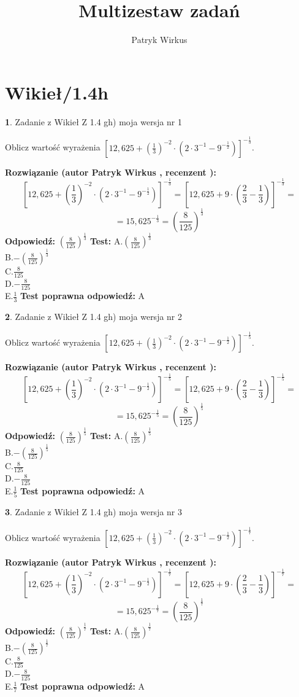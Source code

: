 \documentclass[12pt, a4paper]{article}
\title{Multizestaw zadań}
\author{Patryk Wirkus}
\date{}
\theoremstyle{definition} %
\newtheorem{zad}{}
\newcommand{\kategoria}[1]{\section{#1}}
\newcommand{\zadStart}[1]{\begin{zad}#1\newline}
\newcommand{\zadStop}{\end{zad}}
\newcommand{\rozwStart}[2]{\noindent \textbf{Rozwiązanie (autor #1 , recenzent #2): }\newline}
\newcommand{\rozwStop}{\newline}
\newcommand{\odpStart}{\noindent \textbf{Odpowiedź:}\newline}
\newcommand{\odpStop}{\newline}
\newcommand{\testStart}{\noindent \textbf{Test:}\newline}
\newcommand{\testStop}{\newline}
\newcommand{\kluczStart}{\noindent \textbf{Test poprawna odpowiedź:}\newline}
\newcommand{\kluczStop}{\newline}
\begin{document}
\maketitle

\kategoria{Wikieł/1.4h}


\zadStart{Zadanie z Wikieł Z 1.4 gh) moja wersja nr 1}

Oblicz wartość wyrażenia $[12,625+(\frac{1}{3})^{-2}\cdot(2\cdot 3^{-1} - 9^{-\frac{1}{2}})]^{-\frac{1}{3}}$.
\zadStop
\rozwStart{Patryk Wirkus}{}
$$[12,625+(\frac{1}{3})^{-2}\cdot(2\cdot 3^{-1} - 9^{-\frac{1}{2}})]^{-\frac{1}{3}} = [12,625+9\cdot (\frac{2}{3}-\frac{1}{3})]^{-\frac{1}{3}} =$$
$$=15,625^{-\frac{1}{3}} = (\frac{8}{125})^\frac{1}{3}$$
\rozwStop
\odpStart
$(\frac{8}{125})^\frac{1}{3}$
\odpStop
\testStart
A.$(\frac{8}{125})^\frac{1}{3}$\\ B.$-(\frac{8}{125})^\frac{1}{3}$\\ C.$\frac{8}{125}$\\ D.$-\frac{8}{125}$\\ E.$\frac{1}{3}$
\testStop
\kluczStart
A
\kluczStop



\zadStart{Zadanie z Wikieł Z 1.4 gh) moja wersja nr 2}

Oblicz wartość wyrażenia $[12,625+(\frac{1}{3})^{-2}\cdot(2\cdot 3^{-1} - 9^{-\frac{1}{2}})]^{-\frac{1}{5}}$.
\zadStop
\rozwStart{Patryk Wirkus}{}
$$[12,625+(\frac{1}{3})^{-2}\cdot(2\cdot 3^{-1} - 9^{-\frac{1}{2}})]^{-\frac{1}{5}} = [12,625+9\cdot (\frac{2}{3}-\frac{1}{3})]^{-\frac{1}{5}} =$$
$$=15,625^{-\frac{1}{5}} = (\frac{8}{125})^\frac{1}{5}$$
\rozwStop
\odpStart
$(\frac{8}{125})^\frac{1}{5}$
\odpStop
\testStart
A.$(\frac{8}{125})^\frac{1}{5}$\\ B.$-(\frac{8}{125})^\frac{1}{5}$\\ C.$\frac{8}{125}$\\ D.$-\frac{8}{125}$\\ E.$\frac{1}{5}$
\testStop
\kluczStart
A
\kluczStop



\zadStart{Zadanie z Wikieł Z 1.4 gh) moja wersja nr 3}

Oblicz wartość wyrażenia $[12,625+(\frac{1}{3})^{-2}\cdot(2\cdot 3^{-1} - 9^{-\frac{1}{2}})]^{-\frac{1}{7}}$.
\zadStop
\rozwStart{Patryk Wirkus}{}
$$[12,625+(\frac{1}{3})^{-2}\cdot(2\cdot 3^{-1} - 9^{-\frac{1}{2}})]^{-\frac{1}{7}} = [12,625+9\cdot (\frac{2}{3}-\frac{1}{3})]^{-\frac{1}{7}} =$$
$$=15,625^{-\frac{1}{7}} = (\frac{8}{125})^\frac{1}{7}$$
\rozwStop
\odpStart
$(\frac{8}{125})^\frac{1}{7}$
\odpStop
\testStart
A.$(\frac{8}{125})^\frac{1}{7}$\\ B.$-(\frac{8}{125})^\frac{1}{7}$\\ C.$\frac{8}{125}$\\ D.$-\frac{8}{125}$\\ E.$\frac{1}{7}$
\testStop
\kluczStart
A
\kluczStop
\end{document}
